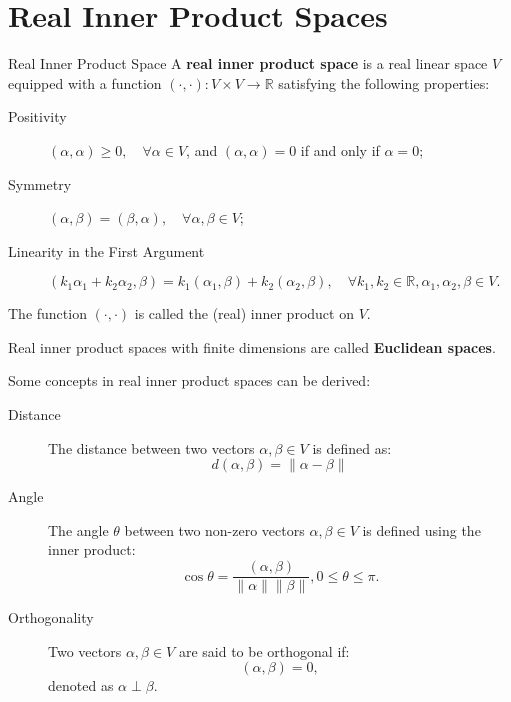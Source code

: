 \documentclass[11pt]{../../TexTemplate/elegantbook} %
\begin{document}
\section{Real Inner Product Spaces}
\begin{definition}{Real Inner Product Space}
    A \textbf{real inner product space} is a real linear space \( V \) 
    equipped with a function \( (\cdot, \cdot): V \times V \to \mathbb{R} \) 
    satisfying the following properties:
    \begin{description}
        \item [Positivity] \( (\alpha, \alpha) \geq 0, \quad \forall \alpha \in V\),
            and \( (\alpha, \alpha) = 0 \) if and only if \( \alpha = 0 \);
        \item [Symmetry] \( (\alpha, \beta) = (\beta, \alpha), \quad \forall \alpha, \beta \in V\);
        \item [Linearity in the First Argument] 
            \( (k_1\alpha_1 + k_2\alpha_2, \beta) = k_1(\alpha_1, \beta) + k_2(\alpha_2, \beta), 
            \quad \forall k_1, k_2 \in \mathbb{R}, 
            \alpha_1, \alpha_2, \beta \in V. \)
    \end{description}
    The function \( (\cdot, \cdot) \) is called the (real) inner product on \( V \).

    Real inner product spaces with finite dimensions are called \textbf{Euclidean spaces}. 
\end{definition}

Some concepts in real inner product spaces can be derived:
\begin{description}
    \item[Distance] The distance between two vectors \( \alpha, \beta \in V \) is defined as:
    \[
    d(\alpha, \beta) = \| \alpha - \beta \|
    \]
    \item[Angle] The angle \( \theta \) between two non-zero vectors \( \alpha, \beta \in V \) is defined using the inner product:
    \[
    \cos \theta = \frac{(\alpha, \beta)}{\|\alpha\| \|\beta\|}, 0 \leq \theta \leq \pi.
    \]
    \item[Orthogonality] Two vectors \( \alpha, \beta \in V \) are said to be orthogonal if:
    \[
    (\alpha, \beta) = 0,
    \]
    denoted as \( \alpha \perp \beta \).
\end{description}
\end{document}
